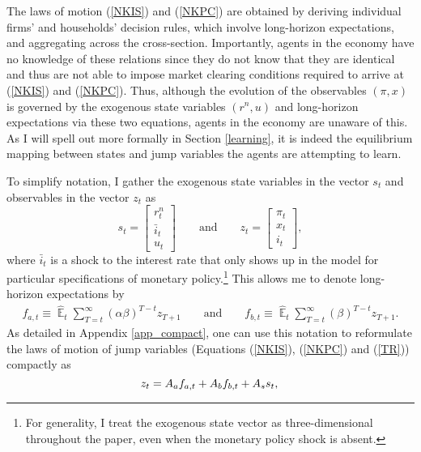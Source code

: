 \documentclass[11pt]{article}
\renewcommand{\[}{\begin{equation}}
\renewcommand{\]}{\end{equation}}
\DeclareMathOperator{\E}{\mathbb{E}}
\begin{document}
The laws of motion (\ref{NKIS}) and (\ref{NKPC}) are obtained by deriving individual firms' and households' decision rules, which involve long-horizon expectations, and aggregating across the cross-section. Importantly, agents in the economy have no knowledge of these relations since they do not know that they are identical and thus are not able to impose market clearing conditions required to arrive at (\ref{NKIS}) and (\ref{NKPC}). Thus, although the evolution of the observables $(\pi,x)$ is governed by the exogenous state variables $(r^n, u)$ and long-horizon expectations via these two equations, agents in the economy are unaware of this. As I will spell out more formally in Section \ref{learning}, it is indeed the equilibrium mapping between states and jump variables the agents are attempting to learn.

To simplify notation, I gather the exogenous state variables in the vector $s_t$ and observables in the vector $z_t$ as
\begin{equation}
s_t =  \begin{bmatrix}r_t^n \\ \bar{i}_t \\ u_t \end{bmatrix} \quad \quad \text{and} \quad \quad  z_t = \begin{bmatrix}\pi_t \\ x_t \\ i_t \end{bmatrix},
\end{equation}
where $\bar{i}_t$ is a shock to the interest rate that only shows up in the model for particular specifications of monetary policy.\footnote{For generality, I treat the exogenous state vector as three-dimensional throughout the paper, even when the monetary policy shock is absent.} This allows me to denote long-horizon expectations by 
 \begin{align}
f_{a,t}  \equiv  \hat{\E}_t\sum_{T=t}^{\infty} (\alpha\beta)^{T-t } z_{T+1} \quad \quad \text{and} \quad \quad f_{b,t}  \equiv \hat{\E}_t\sum_{T=t}^{\infty} (\beta)^{T-t } z_{T+1} \label{fafb}.
\end{align}
As detailed in Appendix \ref{app_compact}, one can use this notation to reformulate the laws of motion of jump variables (Equations (\ref{NKIS}), (\ref{NKPC}) and (\ref{TR})) compactly as
\begin{equation}
z_t  = A_af_{a,t} + A_b f_{b,t} + A_s s_t \label{LOM_LR}, \\
\end{equation}
\end{document}
